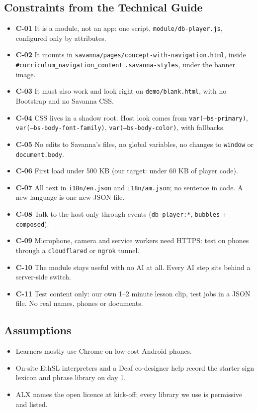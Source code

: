 \documentclass[11pt,a4paper]{article}
\newcommand{\code}[1]{\texttt{#1}}
\newcommand{\req}[1]{\textbf{#1}}
\begin{document}
\subsection{Constraints from the Technical Guide}
\begin{itemize}
  \item \req{C-01} It is a module, not an app: one script, \code{module/db-player.js}, configured only by attributes.
  \item \req{C-02} It mounts in \code{savanna/\allowbreak pages/\allowbreak concept-with-navigation.html}, inside \code{\#curriculum\_\allowbreak navigation\_\allowbreak content} \code{.savanna-styles}, under the banner image.
  \item \req{C-03} It must also work and look right on \code{demo/blank.html}, with no Bootstrap and no Savanna CSS.
  \item \req{C-04} CSS lives in a shadow root. Host look comes from \code{var(--bs-primary)}, \code{var(--bs-body-\allowbreak font-family)}, \code{var(--bs-body-color)}, with fallbacks.
  \item \req{C-05} No edits to Savanna's files, no global variables, no changes to \code{window} or \code{document.\allowbreak body}.
  \item \req{C-06} First load under 500 KB (our target: under 60 KB of player code).
  \item \req{C-07} All text in \code{i18n/en.json} and \code{i18n/am.json}; no sentence in code. A new language is one new JSON file.
  \item \req{C-08} Talk to the host only through events (\code{db-player:*}, \code{bubbles} + \code{composed}).
  \item \req{C-09} Microphone, camera and service workers need HTTPS: test on phones through a \code{cloudflared} or \code{ngrok} tunnel.
  \item \req{C-10} The module stays useful with no AI at all. Every AI step sits behind a server-side switch.
  \item \req{C-11} Test content only: our own 1--2 minute lesson clip, test jobs in a JSON file. No real names, phones or documents.
\end{itemize}

\subsection{Assumptions}
\begin{itemize}
  \item Learners mostly use Chrome on low-cost Android phones.
  \item On-site EthSL interpreters and a Deaf co-designer help record the starter sign lexicon and phrase library on day 1.
  \item ALX names the open licence at kick-off; every library we use is permissive and listed.
\end{itemize}
\end{document}
